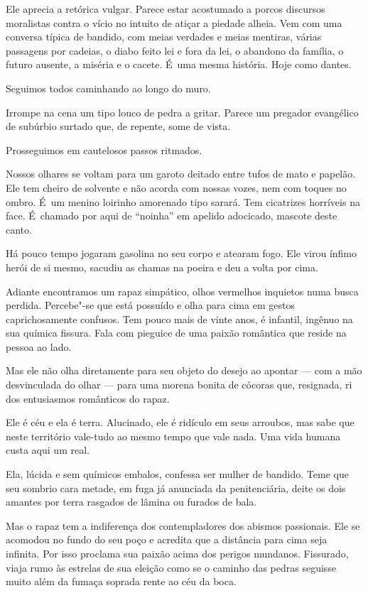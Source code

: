 Ele aprecia a retórica vulgar. Parece estar acostumado a porcos
discursos moralistas contra o vício no intuito de atiçar a piedade
alheia. Vem com uma conversa típica de bandido, com meias verdades e
meias mentiras, várias passagens por cadeias, o diabo feito lei e fora
da lei, o abandono da família, o futuro ausente, a miséria e o cacete. É~uma mesma história. Hoje como dantes.

\asterisc{}

Seguimos todos caminhando ao longo do muro.

Irrompe na cena um tipo louco de pedra a gritar. Parece um pregador
evangélico de subúrbio surtado que, de repente, some de vista.

Prosseguimos em cautelosos passos ritmados.

\asterisc{}

Nossos olhares se voltam para um garoto deitado entre tufos de mato e
papelão. Ele tem cheiro de solvente e não acorda com nossas vozes, nem
com toques no ombro. É~um menino loirinho amorenado tipo sarará. Tem
cicatrizes horríveis na face. É~chamado por aqui de ``noinha'' em
apelido adocicado, mascote deste canto.

Há pouco tempo jogaram gasolina no seu corpo e atearam fogo. Ele virou
ínfimo herói de si mesmo, sacudiu as chamas na poeira e deu a volta por
cima.

Adiante encontramos um rapaz simpático, olhos vermelhos inquietos numa
busca perdida. Percebe"-se que está possuído e olha para cima em gestos
caprichosamente confusos. Tem pouco mais de vinte anos, é infantil,
ingênuo na sua química fissura. Fala com pieguice de uma paixão
romântica que reside na pessoa ao lado.

Mas ele não olha diretamente para seu objeto do desejo ao apontar ---
com a mão desvinculada do olhar --- para uma morena bonita de cócoras
que, resignada, ri dos entusiasmos românticos do rapaz.

Ele é céu e ela é terra. Alucinado, ele é ridículo em seus arroubos, mas
sabe que neste território vale-tudo ao mesmo tempo que vale nada. Uma
vida humana custa aqui um real.

Ela, lúcida e sem químicos embalos, confessa ser mulher de bandido. Teme
que seu sombrio cara metade, em fuga já anunciada da penitenciária,
deite os dois amantes por terra rasgados de lâmina ou furados de bala.

Mas o rapaz tem a indiferença dos contempladores dos abismos passionais.
Ele se acomodou no fundo do seu poço e acredita que a distância para
cima seja infinita. Por isso proclama sua paixão acima dos perigos
mundanos. Fissurado, viaja rumo às estrelas de sua eleição como se o
caminho das pedras seguisse muito além da fumaça soprada rente ao céu da
boca.

